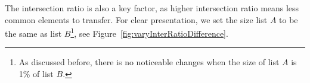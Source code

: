 







The intersection ratio is also a key factor, as higher intersection ratio means less common elements to transfer. For clear presentation, we set the size list $A$ to be the same as list $B$\footnote{As discussed before, there is no noticeable changes when the size of list $A$ is 1\% of list $B$.}, see Figure~\ref{fig:varyInterRatioDifference}.

